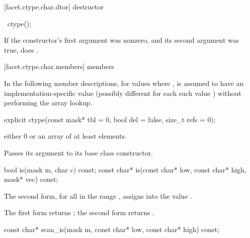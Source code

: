 [facet.ctype.char.dtor]{ destructor}

%
\begin{itemdecl}
~ctype();
\end{itemdecl}

\begin{itemdescr}
\pnum
\effects
If the constructor's first argument was nonzero, and its second argument
was true, does
.
\end{itemdescr}

[facet.ctype.char.members]{ members}

\pnum
{}%
In the following member descriptions, for
values  where ,
 is assumed to have an
implementation-specific value (possibly different for each
such value ) without performing the array lookup.

%
\begin{itemdecl}
explicit ctype(const mask* tbl = 0, bool del = false,
               size_t refs = 0);
\end{itemdecl}

\begin{itemdescr}
\pnum
\precondition
{} either 0 or an array of at least
elements.

\pnum
\effects
Passes its  argument to its base class constructor.
\end{itemdescr}

%
%
\begin{itemdecl}
bool        is(mask m, char c) const;
const char* is(const char* low, const char* high,
               mask* vec) const;
\end{itemdecl}

\begin{itemdescr}
\pnum
\effects
The second form, for all
in the range
,
assigns
into
the value
.

\pnum
\returns
The first form returns
;
the second form returns .
\end{itemdescr}

%
%
\begin{itemdecl}
const char* scan_is(mask m,
                    const char* low, const char* high) const;
\end{itemdecl}

